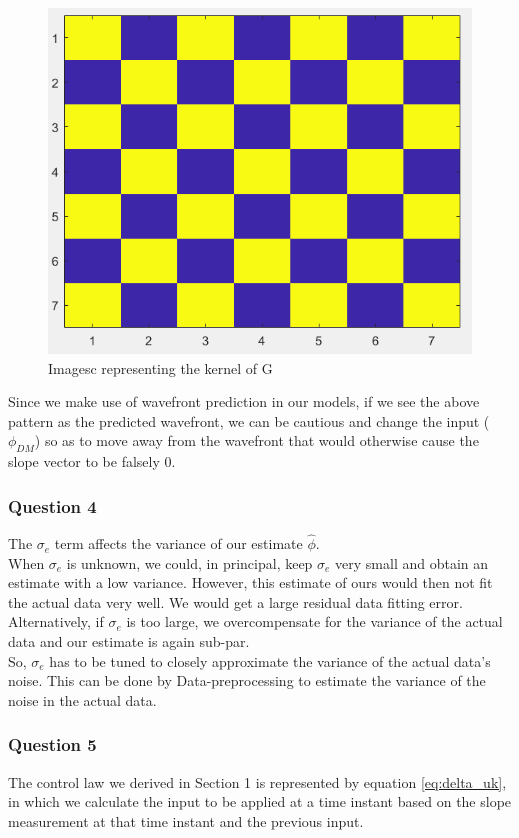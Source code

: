 \documentclass[12pt]{report}
\begin{document}
\begin{figure}[!h]
	\centering
	\includegraphics[width=0.7\linewidth]{G_nullSpaceVectors}
	\caption{Imagesc representing the kernel of G}
	\label{fig:gnullspacevectors}
\end{figure}

Since we make use of wavefront prediction in our models, if we see the above pattern as the predicted wavefront, we can be cautious and change the input ($\phi_{DM}$) so as to move away from the wavefront that would otherwise cause the slope vector to be falsely 0.

\subsubsection*{Question 4}
The $\sigma_{e}$ term affects the variance of our estimate $\hat{\phi}$.\\
When $\sigma_{e}$ is unknown, we could, in principal, keep $\sigma_{e}$ very small and obtain an estimate with a low variance. However, this estimate of ours would then not fit the actual data very well. We would get a large residual data fitting error.\\
Alternatively, if $\sigma_{e}$ is too large, we overcompensate for the variance of the actual data and our estimate is again sub-par.\\
So, $\sigma_{e}$ has to be tuned to closely approximate the variance of the actual data's noise. This can be done by Data-preprocessing to estimate the variance of the noise in the actual data.

\subsubsection*{Question 5}
The control law we derived in Section 1 is represented by equation \ref{eq:delta_uk}, in which we calculate the input to be applied at a time instant based on the slope measurement at that time instant and the previous input.
\end{document}
